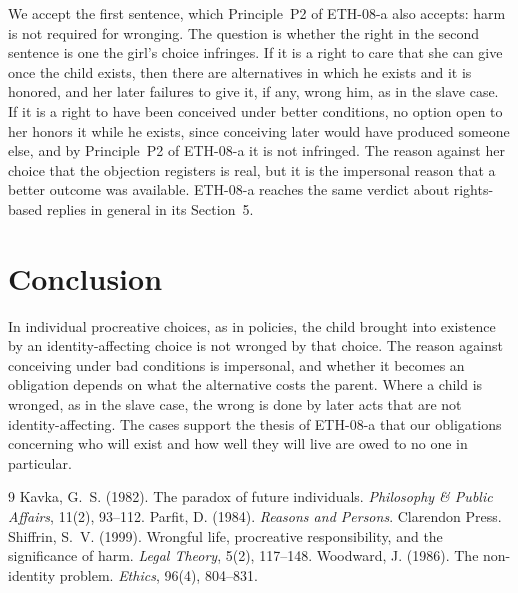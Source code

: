 \documentclass{situationist-preprint}
\begin{document}
\begin{reply}
We accept the first sentence, which Principle~P2 of ETH-08-a also accepts: harm is not required for wronging. The question is whether the right in the second sentence is one the girl's choice infringes. If it is a right to care that she can give once the child exists, then there are alternatives in which he exists and it is honored, and her later failures to give it, if any, wrong him, as in the slave case. If it is a right to have been conceived under better conditions, no option open to her honors it while he exists, since conceiving later would have produced someone else, and by Principle~P2 of ETH-08-a it is not infringed. The reason against her choice that the objection registers is real, but it is the impersonal reason that a better outcome was available. ETH-08-a reaches the same verdict about rights-based replies in general in its Section~5.
\end{reply}

\section{Conclusion}

In individual procreative choices, as in policies, the child brought into existence by an identity-affecting choice is not wronged by that choice. The reason against conceiving under bad conditions is impersonal, and whether it becomes an obligation depends on what the alternative costs the parent. Where a child is wronged, as in the slave case, the wrong is done by later acts that are not identity-affecting. The cases support the thesis of ETH-08-a that our obligations concerning who will exist and how well they will live are owed to no one in particular.

\begin{thebibliography}{9}\small
{} Kavka, G.~S. (1982). The paradox of future individuals. \emph{Philosophy \& Public Affairs}, 11(2), 93--112.
 Parfit, D. (1984). \emph{Reasons and Persons}. Clarendon Press.
 Shiffrin, S.~V. (1999). Wrongful life, procreative responsibility, and the significance of harm. \emph{Legal Theory}, 5(2), 117--148.
 Woodward, J. (1986). The non-identity problem. \emph{Ethics}, 96(4), 804--831.
\end{thebibliography}
\end{document}
